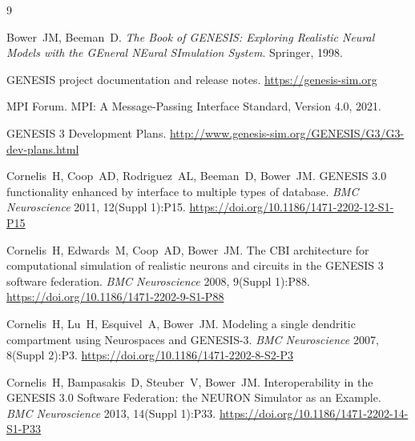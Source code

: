 \documentclass[11pt,a4paper]{article}
\begin{document}
\begin{thebibliography}{9}

Bower~JM, Beeman~D.
\textit{The Book of GENESIS: Exploring Realistic Neural Models with the GEneral NEural SImulation System}.
Springer, 1998.

GENESIS project documentation and release notes.
\url{https://genesis-sim.org}

MPI Forum.
MPI: A Message-Passing Interface Standard, Version 4.0, 2021.

GENESIS 3 Development Plans.
\url{http://www.genesis-sim.org/GENESIS/G3/G3-dev-plans.html}

Cornelis~H, Coop~AD, Rodriguez~AL, Beeman~D, Bower~JM.
GENESIS 3.0 functionality enhanced by interface to multiple types of database.
\textit{BMC Neuroscience} 2011, 12(Suppl 1):P15.
\url{https://doi.org/10.1186/1471-2202-12-S1-P15}

Cornelis~H, Edwards~M, Coop~AD, Bower~JM.
The CBI architecture for computational simulation of realistic neurons and circuits in the GENESIS 3 software federation.
\textit{BMC Neuroscience} 2008, 9(Suppl 1):P88.
\url{https://doi.org/10.1186/1471-2202-9-S1-P88}

Cornelis~H, Lu~H, Esquivel~A, Bower~JM.
Modeling a single dendritic compartment using Neurospaces and GENESIS-3.
\textit{BMC Neuroscience} 2007, 8(Suppl 2):P3.
\url{https://doi.org/10.1186/1471-2202-8-S2-P3}

Cornelis~H, Bampasakis~D, Steuber~V, Bower~JM.
Interoperability in the GENESIS 3.0 Software Federation: the NEURON Simulator as an Example.
\textit{BMC Neuroscience} 2013, 14(Suppl 1):P33.
\url{https://doi.org/10.1186/1471-2202-14-S1-P33}

\end{thebibliography}
\end{document}
